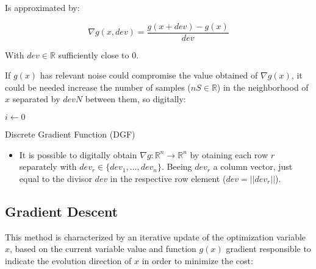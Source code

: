 Is approximated by:

\begin{equation}
    \nabla g(x, dev) = \frac{g(x + dev) - g(x)}{dev}
    \label{eq:Gradient_Discretization}
\end{equation}

With \(dev \in \mathbb{R}\) sufficiently close to \(0\). \par

If \(g(x)\) has relevant noise could compromise the value obtained of \(\nabla g(x)\), it could be needed increase the number of samples (\(nS \in \mathbb{R}\)) in the neighborhood of \(x\) separated by \(devN\) between them, so digitally:
  \begin{algorithm}
    $i\gets 0$\;
    \caption{Discrete Gradient Function (DGF)} \label{alg:Discrete_Gradient_Function}
  \end{algorithm}

\begin{tcolorbox}[colback=blue!5!white,colframe=blue!35!white,title=Notes:]
\begin{itemize}
    \item It is possible to digitally obtain \(\nabla g : \mathbb{R}^n \to \mathbb{R}^n\) by otaining each row \(r\) separately with \(dev_r \in \{ dev_1, ..., dev_n \} \). Beeing \(dev_r \) a column vector, just equal to the divisor \(dev\) in the respective row element (\(dev = ||dev_r||\)).
\end{itemize}
\end{tcolorbox} 



\subsection{Gradient Descent}
\label{subsec:Gradient_Descent} 

This method is characterized by an iterative update of the optimization variable \(x\), based on the current variable value and function \(g(x)\) gradient responsible to indicate the evolution direction of \(x\) in order to minimize the cost:

